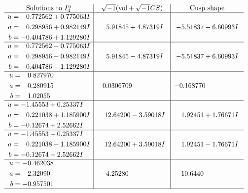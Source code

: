 \documentclass[1p]{elsarticle_modified}
\theoremstyle{definition}
\newcommand{\I}{\sqrt{-1}}
\begin{document}
$$\begin{array}{c|c|c}  
\text{Solutions to }I^u_{4}& \I (\text{vol} + \sqrt{-1}CS) & \text{Cusp shape}\\
 \hline 
\begin{aligned}
u &= \phantom{-}0.772562 + 0.775063 I \\
a &= \phantom{-}0.298956 + 0.982149 I \\
b &= -0.404786 + 1.129280 I\end{aligned}
 & \phantom{-}5.91845 + 4.87319 I & -5.51837 - 6.60993 I \\ \hline\begin{aligned}
u &= \phantom{-}0.772562 - 0.775063 I \\
a &= \phantom{-}0.298956 - 0.982149 I \\
b &= -0.404786 - 1.129280 I\end{aligned}
 & \phantom{-}5.91845 - 4.87319 I & -5.51837 + 6.60993 I \\ \hline\begin{aligned}
u &= \phantom{-}0.827970\phantom{ +0.000000I} \\
a &= \phantom{-}0.280915\phantom{ +0.000000I} \\
b &= \phantom{-}1.02055\phantom{ +0.000000I}\end{aligned}
 & \phantom{-}0.0306709\phantom{ +0.000000I} & -0.168770\phantom{ +0.000000I} \\ \hline\begin{aligned}
u &= -1.45553 + 0.25337 I \\
a &= \phantom{-}0.221038 + 1.185900 I \\
b &= -0.12674 + 2.52662 I\end{aligned}
 & \phantom{-}12.64200 - 3.59018 I & \phantom{-}1.92451 + 1.76671 I \\ \hline\begin{aligned}
u &= -1.45553 - 0.25337 I \\
a &= \phantom{-}0.221038 - 1.185900 I \\
b &= -0.12674 - 2.52662 I\end{aligned}
 & \phantom{-}12.64200 + 3.59018 I & \phantom{-}1.92451 - 1.76671 I \\ \hline\begin{aligned}
u &= -0.462038\phantom{ +0.000000I} \\
a &= -2.32090\phantom{ +0.000000I} \\
b &= -0.957501\phantom{ +0.000000I}\end{aligned}
 & -4.25280\phantom{ +0.000000I} & -10.6440\phantom{ +0.000000I}\\
 \hline 
 \end{array}$$\newpage\newpage\renewcommand{\arraystretch}{1}
\end{document}
